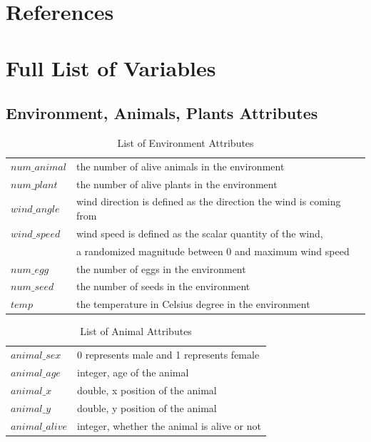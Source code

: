 \documentclass[3p,,preprint,12pt]{elsarticle}
\begin{document}
\section{References}


\pagebreak

\appendix 
\section{Full List of Variables}

\subsection{\textbf{Environment, Animals, Plants Attributes}}
\begin{table}[!htb]
\begin{tabular}{ l l }
 $num\_animal$ & the number of alive animals in the environment \\
 $num\_plant$ & the number of alive plants in the environment \\
 $wind\_angle$ & wind direction is defined as the direction the wind is coming from \\ 
 $wind\_speed$ & wind speed is defined as the scalar quantity of the wind, \\
 & a randomized magnitude between 0 and maximum wind speed \\
 $num\_egg$ & the number of eggs in the environment \\
 $num\_seed$ & the number of seeds in the environment \\
 $temp$ & the temperature in Celsius degree in the environment \\
\end{tabular}
\caption{\label{tab:table-name}List of Environment Attributes}
\end{table}

\begin{table}[!htb]
\begin{tabular}{ l l }
 $animal\_sex$ & 0 represents male and 1 represents female\\
 $animal\_age$ & integer, age of the animal \\ 
 $animal\_x$ & double, x position of the animal \\
 $animal\_y$ & double, y position of the animal \\
 $animal\_alive$ & integer, whether the animal is alive or not\\
\end{tabular}
\caption{\label{tab:table-name}List of Animal Attributes}
\end{table}
\end{document}
